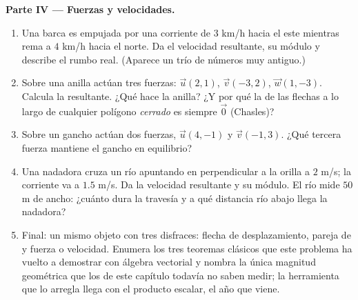 \begin{problem}
\medskip
\noindent\textbf{Parte IV --- Fuerzas y velocidades.}
\begin{enumerate}[resume]
  \item Una barca es empujada por una corriente de $3$ km/h hacia el este
        mientras rema a $4$ km/h hacia el norte. Da el  velocidad
        resultante, su módulo y describe el rumbo real. (Aparece un trío
        de números muy antiguo.)
  \item Sobre una anilla actúan tres fuerzas: $\vec u(2, 1)$,
        $\vec v(-3, 2)$, $\vec w(1, -3)$. Calcula la resultante. ¿Qué hace
        la anilla? ¿Y por qué la  de las flechas a lo largo de
        cualquier polígono \emph{cerrado} es siempre $\vec 0$ (Chasles)?
  \item Sobre un gancho actúan dos fuerzas, $\vec u(4, -1)$ y
        $\vec v(-1, 3)$. ¿Qué tercera fuerza mantiene el gancho en
        equilibrio?
  \item Una nadadora cruza un río apuntando en perpendicular a la orilla
        a $2$ m/s; la corriente va a $1.5$ m/s. Da la velocidad resultante
        y su módulo. El río mide $50$ m de ancho: ¿cuánto dura la travesía
        y a qué distancia río abajo llega la nadadora?
  \item Final: un mismo objeto con tres disfraces: flecha de
        desplazamiento, pareja de  y fuerza o velocidad.
        Enumera los tres teoremas clásicos que este problema ha vuelto a
        demostrar con álgebra vectorial y nombra la única magnitud
        geométrica que los  de este capítulo todavía no saben
        medir; la herramienta que lo arregla llega con el producto
        escalar, el año que viene.
\end{enumerate}
\end{problem}
